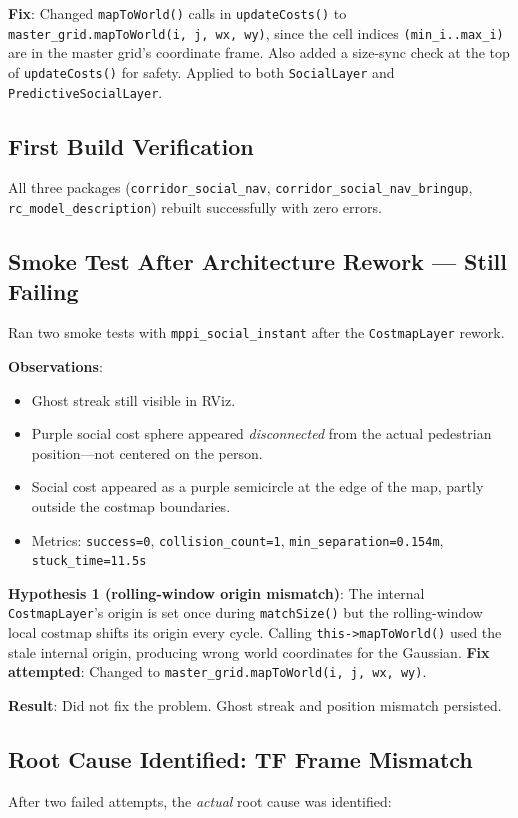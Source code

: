 \documentclass[11pt]{article}
\newcommand{\logentry}[1]{\subsection*{#1}}
\begin{document}
\textbf{Fix}: Changed \texttt{mapToWorld()} calls in \texttt{updateCosts()} to
\texttt{master\_grid.mapToWorld(i, j, wx, wy)}, since the cell indices
\texttt{(min\_i..max\_i)} are in the master grid's coordinate frame. Also added
a size-sync check at the top of \texttt{updateCosts()} for safety. Applied to
both \texttt{SocialLayer} and \texttt{PredictiveSocialLayer}.

\logentry{First Build Verification}
All three packages (\texttt{corridor\_social\_nav},
\texttt{corridor\_social\_nav\_bringup}, \texttt{rc\_model\_description})
rebuilt successfully with zero errors.

\logentry{Smoke Test After Architecture Rework --- Still Failing}
Ran two smoke tests with \texttt{mppi\_social\_instant} after the
\texttt{CostmapLayer} rework.

\textbf{Observations}:
\begin{itemize}
  \item Ghost streak still visible in RViz.
  \item Purple social cost sphere appeared \emph{disconnected} from the actual
    pedestrian position---not centered on the person.
  \item Social cost appeared as a purple semicircle at the edge of the map,
    partly outside the costmap boundaries.
  \item Metrics: \texttt{success=0}, \texttt{collision\_count=1},
    \texttt{min\_separation=0.154m}, \texttt{stuck\_time=11.5s}
\end{itemize}

\noindent\textbf{Hypothesis 1 (rolling-window origin mismatch)}: The internal
\texttt{CostmapLayer}'s origin is set once during \texttt{matchSize()} but the
rolling-window local costmap shifts its origin every cycle. Calling
\texttt{this->mapToWorld()} used the stale internal origin, producing wrong
world coordinates for the Gaussian. \textbf{Fix attempted}: Changed to
\texttt{master\_grid.mapToWorld(i, j, wx, wy)}.

\textbf{Result}: Did not fix the problem. Ghost streak and position mismatch
persisted.

\logentry{Root Cause Identified: TF Frame Mismatch}
After two failed attempts, the \emph{actual} root cause was identified:
\end{document}
